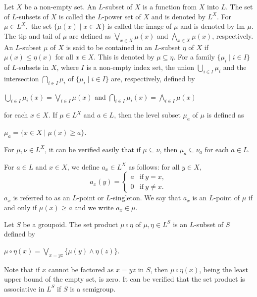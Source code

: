 \documentclass[10pt]{article}
\theoremstyle{plain}
\theoremstyle{definition}
\theoremstyle{remark}
\theoremstyle{case}
\begin{document}
Let $X$ be a non-empty set. An $L$-subset of $X$ is a function from $X$  into $L$. The set of  $L$-subsets of $X$ is called  the $L$-power set of $X$ and is denoted by $L^X$.  For  $\mu \in L^X, $  the set $ \lbrace\mu(x) \mid x \in X \rbrace$  is called the image of $\mu$  and is denoted by  Im $\mu $. The tip and tail of $ \mu $  are defined as $\bigvee \limits_{x \in X}\mu(x)$ and $\bigwedge \limits_{x \in X}\mu(x)$, respectively. An $L$-subset $\mu$ of $X$ is said to be contained in an $L$-subset $\eta$  of $X$ if  $\mu(x)\leq \eta (x)$ for all $x \in X$. This is denoted by $\mu \subseteq \eta $.  For a family $\lbrace\mu_{i} \mid i \in I \rbrace$  of $L$-subsets in  $X$, where $I$  is a non-empty index set, the union $\bigcup\limits_{i \in I} \mu_{i} $    and the intersection  $\bigcap\limits_{i \in I} \mu_{i} $ of  $\lbrace\mu_{i} \mid i \in I \rbrace$ are, respectively, defined by
\begin{center}
	$\bigcup\limits_{i \in I} \mu_{i}(x)= \bigvee\limits_{i \in I} \mu(x)  $ \quad and \quad $\bigcap\limits_{i \in I} \mu_{i} (x)= \bigwedge\limits_{i \in I} \mu(x) $
\end{center}
for each  $x \in X $. If  $\mu \in L^X $  and  $a \in L $,  then the level  subset $\mu_{a}$ of $\mu$  is defined as
\begin{center}
	$\mu_{a}= \lbrace x \in X \mid \mu (x) \geq a\rbrace.$
\end{center}
 For $\mu, \nu \in L^{X} $, it can be verified easily that if $\mu\subseteq \nu$, then $\mu_{a} \subseteq \nu_{a} $ for each $a\in L $.

For $a\in L$ and $x \in X$, we define $a_{x} \in L^{X} $ as follows: for all $y \in X$,
\[
a_{x} ( y ) =
\begin{cases}
	a &\text{if} \ y = x,\\
	0 &\text{if} \ y\ne x.
\end{cases}
\]
$a_{x} $ is referred to as an $L$-point or $L$-singleton. We say that $a_{x} $ is an $L$-point of $\mu$ if and only if
$\mu( x )\ge a$ and we write $a_{x} \in \mu$. 

Let $S$ be a groupoid. The set product $\mu \circ \eta$   of $\mu, \eta \in L^S$ is an $L$-subset of $S$ defined by
\begin{center}
	$\mu \circ \eta (x) = \bigvee \limits_{x=yz}\lbrace\mu (y) \wedge \eta (z) \rbrace.$
\end{center}

\noindent Note that if $x$ cannot be factored as  $x=yz$  in $S$, then  $\mu \circ \eta (x)$, being  the least upper bound of the empty set, is zero. It can be verified that the set product is associative in  $L^S$  if $S$ is a semigroup.
\end{document}
